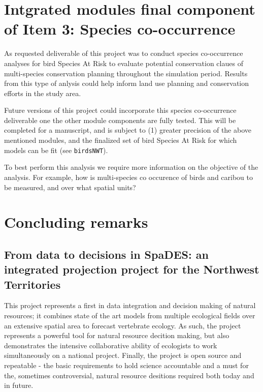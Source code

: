 \documentclass[]{article}
\begin{document}
\section{Intgrated modules final component of Item 3: Species
co-occurrence}\label{intgrated-modules-final-component-of-item-3-species-co-occurrence}

As requested deliverable of this project was to conduct species
co-occurrence analyses for bird Species At Risk to evaluate potential
conservation claues of multi-species conservation planning throughout
the simulation period. Results from this type of anlysis could help
inform land use planning and conservation efforts in the study area.

Future versions of this project could incorporate this species
co-occurrence deliverable one the other module components are fully
tested. This will be completed for a manuscript, and is subject to (1)
greater precision of the above mentioned modules, and the finalized set
of bird Species At Risk for which models can be fit (see
\texttt{birdsNWT}).

To best perform this analysis we require more information on the
objective of the analysis. For example, how is multi-species co
occurence of birds and caribou to be measured, and over what spatial
units?

\section{Concluding remarks}\label{concluding-remarks}

\subsection{From data to decisions in SpaDES: an integrated projection
project for the Northwest
Territories}\label{from-data-to-decisions-in-spades-an-integrated-projection-project-for-the-northwest-territories}

This project represents a first in data integration and decision making
of natural resources; it combines state of the art models from multiple
ecological fields over an extensive spatial area to forecast vertebrate
ecology. As such, the project represents a powerful tool for natural
resource decition making, but also demonstrates the intensive
collaborative ability of ecologists to work simultaneously on a national
project. Finally, the project is open source and repeatable - the basic
requirements to hold science accountable and a must for the, sometimes
controversial, natural resource desitions required both today and in
future.
\end{document}
